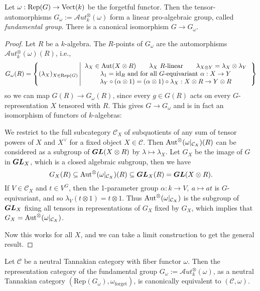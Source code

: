\begin{prop}
 Let $\omega : \mathrm{Rep}(G) \to \mathrm{Vect}(k)$ be the forgetful functor. Then the tensor-automorphisms $G_\omega := \mathcal{A}ut^{\otimes}_k(\omega)$ form a linear pro-algebraic group, called \emph{fundamental group}. There is a canonical isomorphism $G \to G_\omega$.
\end{prop}
\begin{proof}
 Let $R$ be a $k$-algebra. The $R$-points of $G_\omega$ are the automorphisms $\mathcal{A}ut^{\otimes}_k(\omega)(R)$, i.e.,
\[
G_\omega(R) = \left\{ (\lambda_X)_{X \in \mathrm{Rep}(G)} 
\left| \begin{array}{c}
 \lambda_X \in \mathrm{Aut}(X \otimes R) \qquad \lambda_X\ R\textrm{-linear} \qquad \lambda_{X\otimes Y} = \lambda_X \otimes \lambda_Y \\ 
 \lambda_1 = \mathrm{id}_R \textrm{ and for all } G\textrm{-equivariant } \alpha : X \to Y \\ 
 \lambda_Y \circ (\alpha \otimes 1) = (\alpha \otimes 1) \circ \lambda_X : X \otimes R \to Y \otimes R
\end{array} \right.
 \right\}
 \]
so we can map $G(R) \to G_\omega(R)$, since every $g \in G(R)$ acts on every $G$-representation $X$ tensored with $R$.
This gives $G \to G_\omega$ and is in fact an isomorphism of functors of $k$-algebras:

We restrict to the full subcategory $\mathcal{C}_X$ of subquotients of any sum of tensor powers of $X$ and $X^\vee$ for a fixed object $X \in \mathcal{C}$. Then $\mathrm{Aut}^{\otimes}(\omega|_{\mathcal{C}_X})(R)$ can be considered as a subgroup of $\boldsymbol{GL}(X \otimes R)$ by $\lambda \mapsto \lambda_X$. Let $G_X$ be the image of $G$ in $\boldsymbol{GL}_X$, which is a closed algebraic subgroup, then we have
\[G_X(R) \subseteq \mathrm{Aut}^{\otimes}(\omega|_{\mathcal{C}_X})(R) \subseteq \boldsymbol{GL}_X(R) = \boldsymbol{GL}(X \otimes R).\]
If $V \in \mathcal{C}_X$ and $t \in V^G$, then the 1-parameter group $\alpha : k \to V,\ a \mapsto at$ is $G$-equivariant, and so $\lambda_V(t \otimes 1) = t \otimes 1$.
Thus $\mathrm{Aut}^{\otimes}(\omega|_{\mathcal{C}_X})$ is the subgroup of $\boldsymbol{GL}_X$ fixing all tensors in representations of $G_X$ fixed by $G_X$, which implies that $G_X = \mathrm{Aut}^{\otimes}(\omega|_{\mathcal{C}_X})$.

Now this works for all $X$, and we can take a limit construction to get the general result.
\end{proof}



\begin{thm}
 Let $\mathcal{C}$ be a neutral Tannakian category with fiber functor $\omega$. Then the representation category of the fundamental group $G_\omega := \mathcal{A}ut^{\otimes}_k(\omega)$, as a neutral Tannakian category $(\mathrm{Rep}(G_\omega),\omega_\textrm{forget})$, is canonically equivalent to $(\mathcal{C},\omega)$.
\end{thm}

